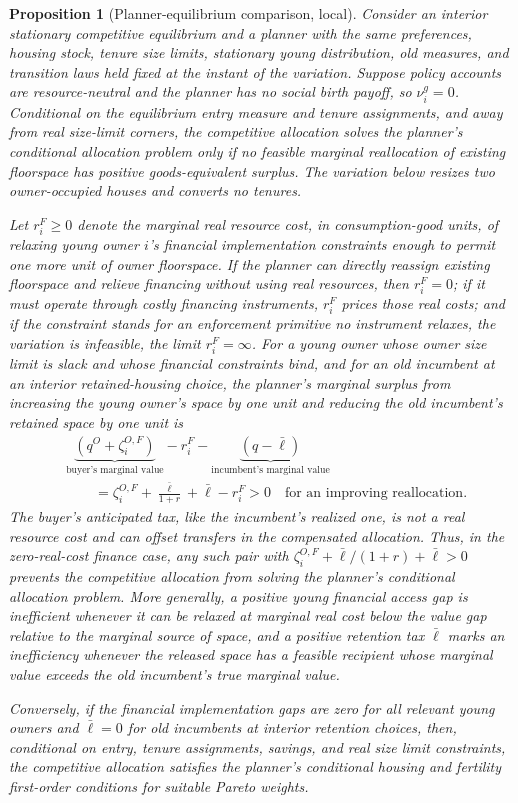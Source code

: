 \documentclass[11pt]{article}
\newtheorem{proposition}{Proposition}
\newcommand{\1}{\mathbf 1}
\begin{document}
\begin{proposition}[Planner-equilibrium comparison, local]
Consider an interior stationary competitive equilibrium and a planner with the same preferences, housing stock, tenure size limits, stationary young distribution, old measures, and transition laws held fixed at the instant of the variation. Suppose policy accounts are resource-neutral and the planner has no social birth payoff, so $\nu_i^g=0$. Conditional on the equilibrium entry measure and tenure assignments, and away from real size-limit corners, the competitive allocation solves the planner's conditional allocation problem only if no feasible marginal reallocation of existing floorspace has positive goods-equivalent surplus. The variation below resizes two owner-occupied houses and converts no tenures.

Let $r_i^F\ge0$ denote the marginal real resource cost, in consumption-good units, of relaxing young owner $i$'s financial implementation constraints enough to permit one more unit of owner floorspace. If the planner can directly reassign existing floorspace and relieve financing without using real resources, then $r_i^F=0$; if it must operate through costly financing instruments, $r_i^F$ prices those real costs; and if the constraint stands for an enforcement primitive no instrument relaxes, the variation is infeasible, the limit $r_i^F=\infty$. For a young owner whose owner size limit is slack and whose financial constraints bind, and for an old incumbent at an interior retained-housing choice, the planner's marginal surplus from increasing the young owner's space by one unit and reducing the old incumbent's retained space by one unit is
\[
\begin{aligned}
&\underbrace{\left(q^O+\zeta_i^{O,F}\right)}_{\text{buyer's marginal value}}
-r_i^F
-\underbrace{\left(q-\bar\ell\right)}_{\text{incumbent's marginal value}}
\\
&\qquad
=
\zeta_i^{O,F}+\frac{\bar\ell}{1+r}+\bar\ell-r_i^F
>0
\quad\text{for an improving reallocation}.
\end{aligned}
\]
The buyer's anticipated tax, like the incumbent's realized one, is not a real resource cost and can offset transfers in the compensated allocation.
Thus, in the zero-real-cost finance case, any such pair with $\zeta_i^{O,F}+\bar\ell/(1+r)+\bar\ell>0$ prevents the competitive allocation from solving the planner's conditional allocation problem. More generally, a positive young financial access gap is inefficient whenever it can be relaxed at marginal real cost below the value gap relative to the marginal source of space, and a positive retention tax $\bar\ell$ marks an inefficiency whenever the released space has a feasible recipient whose marginal value exceeds the old incumbent's true marginal value.

Conversely, if the financial implementation gaps are zero for all relevant young owners and $\bar\ell=0$ for old incumbents at interior retention choices, then, conditional on entry, tenure assignments, savings, and real size limit constraints, the competitive allocation satisfies the planner's conditional housing and fertility first-order conditions for suitable Pareto weights.
\end{proposition}
\end{document}
